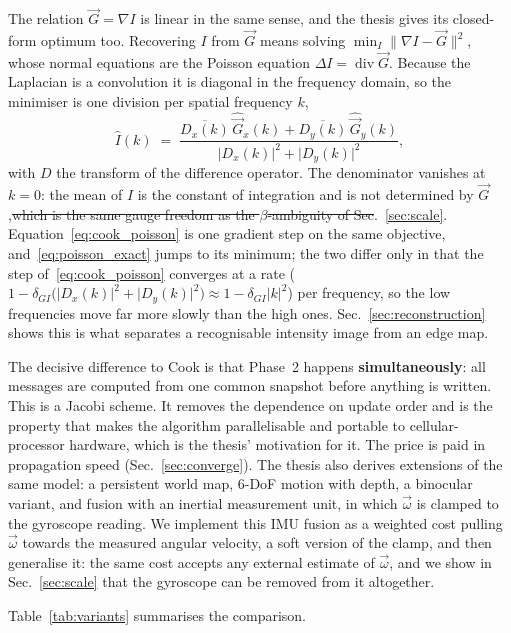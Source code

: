 \documentclass[journal]{IEEEtran}
\newcommand{\Imap}{I}
\newcommand{\Gmap}{\vec{G}}
\newcommand{\wvec}{\vec{\omega}}
\begin{document}
The relation $\Gmap=\nabla\Imap$ is linear in the same sense, and the thesis
gives its closed-form optimum too. Recovering $\Imap$ from $\Gmap$ means solving
$\min_{\Imap}\lVert\nabla\Imap-\Gmap\rVert^2$, whose normal equations are the
Poisson equation $\Delta\Imap = \operatorname{div}\Gmap$. Because the Laplacian
is a convolution it is diagonal in the frequency domain, so the minimiser is one
division per spatial frequency $k$,
\begin{equation}
\widehat{\Imap}(k) \;=\;
  \frac{\overline{D_x(k)}\,\widehat{\Gmap}_x(k)
      + \overline{D_y(k)}\,\widehat{\Gmap}_y(k)}
       {\lvert D_x(k)\rvert^2+\lvert D_y(k)\rvert^2},
\label{eq:poisson_exact}
\end{equation}
with $D$ the transform of the difference operator. The denominator vanishes at
$k=0$: the mean of $\Imap$ is the constant of integration and is not determined
by $\Gmap$,\st{which is the same gauge freedom as the $\beta$-ambiguity of
Sec}.~\ref{sec:scale}. Equation~\eqref{eq:cook_poisson} is one gradient step on
the same objective, and~\eqref{eq:poisson_exact} jumps to its minimum; the two
differ only in that the step of~\eqref{eq:cook_poisson} converges at a rate
($1-\delta_{G\!I}\big(\lvert D_x(k)\rvert^2+\lvert D_y(k)\rvert^2\big)\approx
1-\delta_{G\!I}\lvert k\rvert^2$) per frequency, so the low frequencies move
far more slowly than the high ones. Sec.~\ref{sec:reconstruction} shows this is
what separates a recognisable intensity image from an edge map.

The decisive difference to Cook is that Phase~2 happens \textbf{simultaneously}:
all messages are computed from one common snapshot before anything is written.
This is a Jacobi scheme. It removes the dependence on update order and is the
property that makes the algorithm parallelisable and portable to
cellular-processor hardware, which is the thesis' motivation for it. The price
is paid in propagation speed (Sec.~\ref{sec:converge}). The
thesis also derives extensions of the same
model: a persistent world
map, 6-DoF motion with depth, a binocular variant, and fusion with an inertial measurement unit, in which
$\wvec$ is clamped to the gyroscope reading. We implement this IMU fusion as a weighted cost pulling $\wvec$ towards the measured angular velocity, a soft version of the clamp, and then generalise it: the same cost accepts any external estimate of $\wvec$, and we show in Sec.~\ref{sec:scale} that the gyroscope can be removed from it altogether.

Table~\ref{tab:variants} summarises the comparison.
\end{document}
